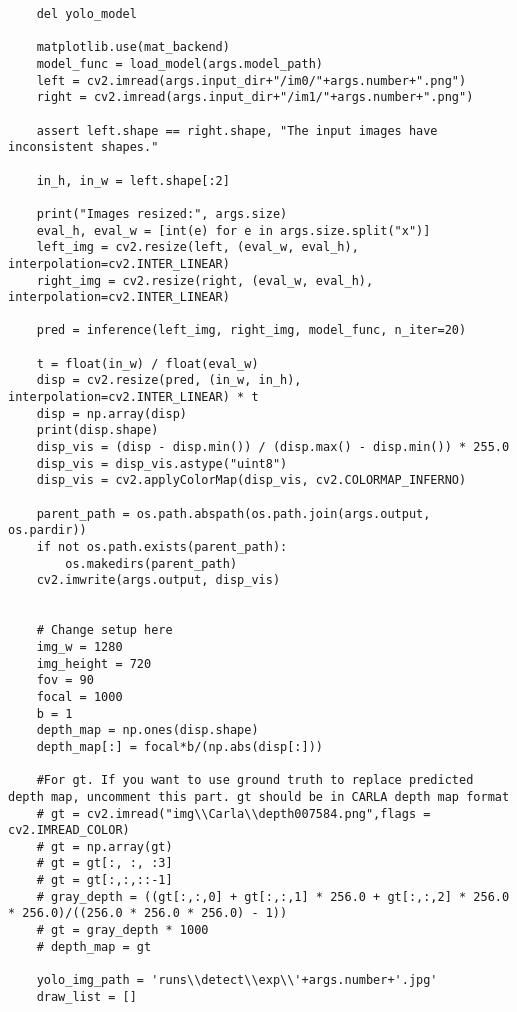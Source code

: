 \begin{lstlisting}
    del yolo_model

    matplotlib.use(mat_backend)
    model_func = load_model(args.model_path)
    left = cv2.imread(args.input_dir+"/im0/"+args.number+".png")
    right = cv2.imread(args.input_dir+"/im1/"+args.number+".png")

    assert left.shape == right.shape, "The input images have inconsistent shapes."

    in_h, in_w = left.shape[:2]

    print("Images resized:", args.size)
    eval_h, eval_w = [int(e) for e in args.size.split("x")]
    left_img = cv2.resize(left, (eval_w, eval_h), interpolation=cv2.INTER_LINEAR)
    right_img = cv2.resize(right, (eval_w, eval_h), interpolation=cv2.INTER_LINEAR)

    pred = inference(left_img, right_img, model_func, n_iter=20)

    t = float(in_w) / float(eval_w)
    disp = cv2.resize(pred, (in_w, in_h), interpolation=cv2.INTER_LINEAR) * t
    disp = np.array(disp)
    print(disp.shape)
    disp_vis = (disp - disp.min()) / (disp.max() - disp.min()) * 255.0
    disp_vis = disp_vis.astype("uint8")
    disp_vis = cv2.applyColorMap(disp_vis, cv2.COLORMAP_INFERNO)

    parent_path = os.path.abspath(os.path.join(args.output, os.pardir))
    if not os.path.exists(parent_path):
        os.makedirs(parent_path)
    cv2.imwrite(args.output, disp_vis)


    # Change setup here
    img_w = 1280
    img_height = 720
    fov = 90
    focal = 1000
    b = 1
    depth_map = np.ones(disp.shape)
    depth_map[:] = focal*b/(np.abs(disp[:]))

    #For gt. If you want to use ground truth to replace predicted depth map, uncomment this part. gt should be in CARLA depth map format
    # gt = cv2.imread("img\\Carla\\depth007584.png",flags = cv2.IMREAD_COLOR)
    # gt = np.array(gt)
    # gt = gt[:, :, :3]
    # gt = gt[:,:,::-1]
    # gray_depth = ((gt[:,:,0] + gt[:,:,1] * 256.0 + gt[:,:,2] * 256.0 * 256.0)/((256.0 * 256.0 * 256.0) - 1))
    # gt = gray_depth * 1000
    # depth_map = gt

    yolo_img_path = 'runs\\detect\\exp\\'+args.number+'.jpg'
    draw_list = []


\end{lstlisting}
